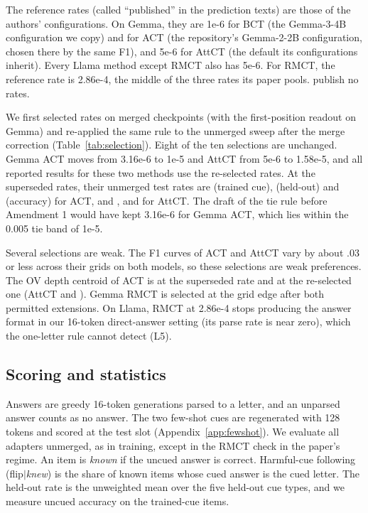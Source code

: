 \documentclass[11pt]{article}
\newcommand{\knew}{\textit{knew}}
\newcommand{\flipk}{flip$\mid$\knew}
\newcommand{\gemma}{Gemma}\newcommand{\gemmafull}{Gemma-2-2B-it}
\newcommand{\llama}{Llama}\newcommand{\llamafull}{Llama-3.1-8B-Instruct}
\begin{document}
The reference rates (called ``published'' in the prediction texts) are those of the authors' configurations. On \gemma, they are 1e-6 for BCT (the Gemma-3-4B configuration we copy) and for ACT (the repository's Gemma-2-2B configuration, chosen there by the same F1), and 5e-6 for AttCT (the default its configurations inherit). Every \llama{} method except RMCT also has 5e-6. For RMCT, the reference rate is 2.86e-4, the middle of the three rates its paper pools. \citet{irpan2025consistency} publish no rates.

We first selected rates on merged checkpoints (with the first-position readout on \gemma) and re-applied the same rule to the unmerged sweep after the merge correction (Table~\ref{tab:selection}). Eight of the ten selections are unchanged. \gemma{} ACT moves from 3.16e-6 to 1e-5 and AttCT from 5e-6 to 1.58e-5, and all reported results for these two methods use the re-selected rates. At the superseded rates, their unmerged test rates are \vGemActOldTrained{} (trained cue), \vGemActOldHeld{} (held-out) and \vGemActOldAcc{} (accuracy) for ACT, and \vGemAttctOldTrained, \vGemAttctOldHeld{} and \vGemAttctOldAcc{} for AttCT. The draft of the tie rule before Amendment 1 would have kept 3.16e-6 for \gemma{} ACT, which lies within the 0.005 tie band of 1e-5.

Several selections are weak. The F1 curves of ACT and AttCT vary by about .03 or less across their grids on both models, so these selections are weak preferences. The OV depth centroid of ACT is \vGemActOVOld{} at the superseded rate and \vGemActOV{} at the re-selected one (AttCT \vGemAttctOVOld{} and \vGemAttctOV). \gemma{} RMCT is selected at the grid edge after both permitted extensions. On \llama, RMCT at 2.86e-4 stops producing the answer format in our 16-token direct-answer setting (its parse rate is near zero), which the one-letter rule cannot detect (L5).

\subsection{Scoring and statistics}
Answers are greedy 16-token generations parsed to a letter, and an unparsed answer counts as no answer. The two few-shot cues are regenerated with 128 tokens and scored at the test slot (Appendix~\ref{app:fewshot}). We evaluate all adapters unmerged, as in training, except in the RMCT check in the paper's regime. An item is \emph{known} if the uncued answer is correct. Harmful-cue following (\flipk) is the share of known items whose cued answer is the cued letter. The held-out rate is the unweighted mean over the five held-out cue types, and we measure uncued accuracy on the trained-cue items.
\end{document}
